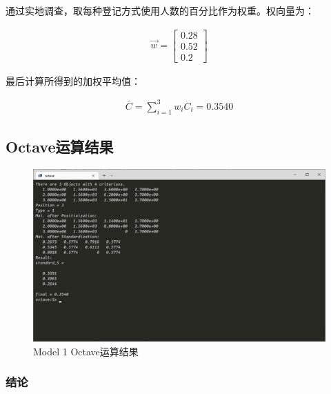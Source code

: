 \documentclass[
  journal=,
  manuscript=,
  year=2022,
  volume=01,
]{cup-journal}
\begin{document}
\par 通过实地调查，取每种登记方式使用人数的百分比作为权重。权向量为：

\begin{equation}
	\begin{aligned}
		\overrightarrow{w}=
		\begin{bmatrix}
			0.28 \\
			0.52 \\
			0.2
		\end{bmatrix}
	\end{aligned}
\end{equation}

\par 最后计算所得到的加权平均值：

\begin{equation}
	\begin{aligned}
		\bar{C}=\sum_{i=1}^{3}w_{i}C_{i}=0.3540
	\end{aligned}
\end{equation}

\subsection{Octave运算结果}

\begin{figure}[hbt!]
	\centering
	\includegraphics[width=0.75\linewidth]{fig/res1.png}
	\caption{Model 1 Octave运算结果}
	\label{fig_res1}
\end{figure}

\subsubsection{结论}
\end{document}
